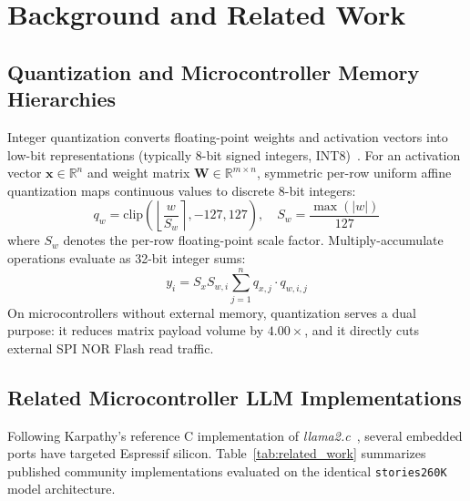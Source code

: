 \documentclass[10pt,a4paper]{article}
\begin{document}
\section{Background and Related Work}
\label{sec:background}

\subsection{Quantization and Microcontroller Memory Hierarchies}
Integer quantization converts floating-point weights and activation vectors into low-bit representations (typically 8-bit signed integers, INT8)~\cite{jacob2018quantization}. For an activation vector $\mathbf{x} \in \mathbb{R}^n$ and weight matrix $\mathbf{W} \in \mathbb{R}^{m \times n}$, symmetric per-row uniform affine quantization maps continuous values to discrete 8-bit integers:
\begin{equation}
    q_w = \text{clip}\left(\left\lfloor \frac{w}{S_w} \right\rceil, -127, 127\right), \quad S_w = \frac{\max(|w|)}{127}
\end{equation}
where $S_w$ denotes the per-row floating-point scale factor. Multiply-accumulate operations evaluate as 32-bit integer sums:
\begin{equation}
    y_i = S_x S_{w,i} \sum_{j=1}^{n} q_{x,j} \cdot q_{w,i,j}
\end{equation}
On microcontrollers without external memory, quantization serves a dual purpose: it reduces matrix payload volume by $4.00\times$, and it directly cuts external SPI NOR Flash read traffic.

\subsection{Related Microcontroller LLM Implementations}
Following Karpathy's reference C implementation of \textit{llama2.c}~\cite{karpathy2023llama2c}, several embedded ports have targeted Espressif silicon. Table~\ref{tab:related_work} summarizes published community implementations evaluated on the identical \texttt{stories260K} model architecture.
\end{document}
